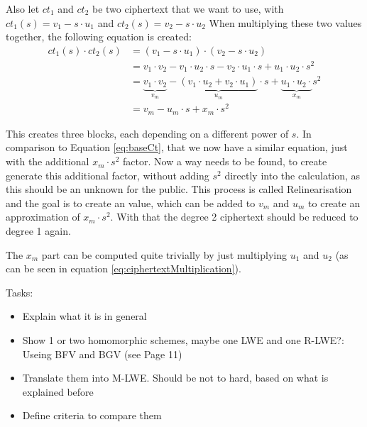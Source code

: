 Also let $ct_1$ and $ct_2$ be two ciphertext that we want to use, with $ct_1(s) = v_1-s\cdot u_1$ and $ct_2(s) = v_2-s\cdot u_2$
When multiplying these two values together, the following equation is created:
\begin{equation}
  \begin{split}
    ct_1(s)\cdot ct_2(s) & = (v_1-s\cdot u_1) \cdot (v_2-s\cdot u_2)                                          \\
                         & = v_1\cdot v_2 - v_1\cdot u_2 \cdot s- v_2\cdot u_1\cdot s + u_1\cdot u_2\cdot s^2 \\
                         & = \underbrace{v_1\cdot v_2}_{v_m} - \underbrace{(v_1\cdot u_2 + v_2\cdot u_1)}_{u_m}\cdot s + \underbrace{u_1\cdot u_2\cdot}_{x_m} s^2 \\
                         & = v_m - u_m\cdot s + x_m \cdot s^2
  \end{split}
  \label{eq:ciphertextMultiplication}
\end{equation}

This creates three blocks, each depending on a different power of $s$. In comparison to Equation \ref{eq:baseCt}, that we now have a similar equation, just with the additional $x_m\cdot s^2$ factor. Now a way needs to be found, to create generate this additional factor, without adding $s^2$ directly into the calculation, as this should be an unknown for the public. This process is called Relinearisation and the goal is to create an value, which can be added to $v_m$ and $u_m$ to create an approximation of $x_m\cdot s^2$. With that the degree 2 ciphertext should be reduced to degree 1 again.


The $x_m$ part can be computed quite trivially by just multiplying $u_1$ and $u_2$ (as can be seen in equation \ref{eq:ciphertextMultiplication}).



Tasks:
\begin{itemize}
  \item Explain what it is in general
  \item Show 1 or two homomorphic schemes, maybe one LWE and one R-LWE?: Useing BFV and BGV (see \cite{FheImplementations} Page 11)
  \item Translate them into M-LWE. Should be not to hard, based on what is explained before
  \item Define criteria to compare them
\end{itemize}